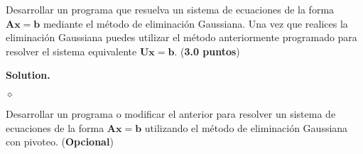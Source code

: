 \documentclass{article}
\theoremstyle{problemstyle}
\newenvironment{solution}{%
  \begin{mdframed}[linewidth=0.8pt,linecolor=Gray,backgroundcolor=Gray!5,roundcorner=5pt]%
  \noindent\textbf{Solution.}%
}{%
\hfill $ \diamond $ 
  \end{mdframed}%
}
\begin{document}
\begin{problem}
Desarrollar un programa que resuelva un sistema de ecuaciones de la forma $ \mathbf{Ax} = \mathbf{b} $ mediante el m\'etodo de eliminaci\'on Gaussiana. Una vez que realices la eliminaci\'on Gaussiana puedes utilizar el m\'etodo anteriormente programado para resolver el sistema equivalente $ \mathbf{Ux} = \mathbf{b} $. (\textbf{3.0 puntos})
\end{problem}
\begin{solution}

  
\end{solution}

\begin{problem}
Desarrollar un programa o modificar el anterior para resolver un sistema de ecuaciones de la forma $ \mathbf{Ax} = \mathbf{b} $ utilizando el m\'etodo de eliminaci\'on Gaussiana con pivoteo. (\textbf{Opcional})
\end{problem}

\end{document}
